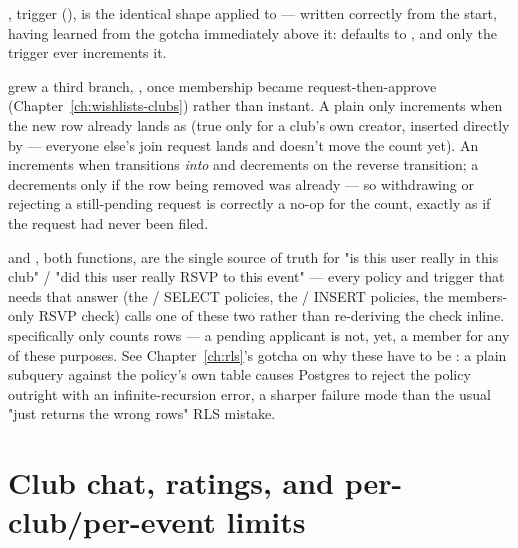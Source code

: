 , trigger  (), is the identical shape applied to  — written correctly from the start, having learned from the gotcha immediately above it:  defaults to , and only the trigger ever increments it.

\begin{olknote}
 grew a third branch, , once membership became request-then-approve (Chapter~\ref{ch:wishlists-clubs}) rather than instant. A plain  only increments when the new row already lands as  (true only for a club's own creator, inserted directly by  — everyone else's join request lands  and doesn't move the count yet). An  increments when  transitions \emph{into}  and decrements on the reverse transition; a  decrements only if the row being removed was already  — so withdrawing or rejecting a still-pending request is correctly a no-op for the count, exactly as if the request had never been filed.
\end{olknote}

 and , both  functions, are the single source of truth for "is this user really in this club" / "did this user really RSVP to this event" — every policy and trigger that needs that answer (the / SELECT policies, the / INSERT policies, the  members-only RSVP check) calls one of these two rather than re-deriving the check inline.  specifically only counts  rows — a pending applicant is not, yet, a member for any of these purposes. See Chapter~\ref{ch:rls}'s gotcha on why these have to be : a plain  subquery against the policy's own table causes Postgres to reject the policy outright with an infinite-recursion error, a sharper failure mode than the usual "just returns the wrong rows" RLS mistake.

\section{Club chat, ratings, and per-club/per-event limits}

